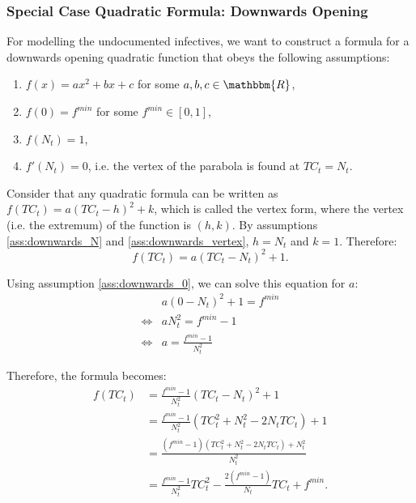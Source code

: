 \documentclass[12pt]{article}
\newcommand{\R}{\mathbbm{R}}
\begin{document}
\begin{appendices}
		\subsubsection{Special Case Quadratic Formula: Downwards Opening} \label{ssapp:downwards_derivation_vertex}
		For modelling the undocumented infectives, we want to construct a formula for a downwards opening quadratic function that obeys the following assumptions:
		\begin{enumerate}[label=(\Roman*)]
		    \item\label{ass:downwards_formula} $f(x) = ax^2 + bx + c$  for some $a, b, c \in \R$,
		    \item\label{ass:downwards_0} $f(0) = f^{min}$ for some $f^{min} \in [0,1]$,
		    \item\label{ass:downwards_N} $f(N_t) = 1$,
		    \item\label{ass:downwards_vertex} $f'(N_t) = 0$, i.e. the vertex of the parabola is found at $TC_t = N_t$.
		\end{enumerate}
		
		Consider that any quadratic formula can be written as $f(TC_t) = a(TC_t - h)^2 + k$, which is called the vertex form, where the vertex (i.e. the extremum) of the function is $(h, k)$. By assumptions \ref{ass:downwards_N} and \ref{ass:downwards_vertex}, $h=N_t$ and $k=1$. Therefore:
		    \[f(TC_t) = a(TC_t - N_t)^2 + 1.\]
		    
		\noindent Using assumption \ref{ass:downwards_0}, we can solve this equation for $a$:
		    \begin{align*}
		        & a(0 - N_t)^2 + 1 = f^{min}\\
		        \iff & aN_t^2 = f^{min} - 1\\
		        \iff & a = \frac{f^{min} - 1}{N_t^2}
		    \end{align*}
		    
		\noindent Therefore, the formula becomes:
		    \begin{align*}
		        f(TC_t) &= \frac{f^{min} - 1}{N_t^2}(TC_t - N_t)^2 + 1 \\
		        &= \frac{f^{min} - 1}{N_t^2}(TC_t^2 + N_t^2 -2N_tTC_t) + 1 \\
		        &= \frac{(f^{min} - 1)(TC_t^2 + N_t^2 -2N_tTC_t) + N_t^2}{N_t^2}\\
                &= \frac{f^{min} - 1}{N_t^2}TC_t^2 - \frac{2(f^{min} - 1)}{N_t}TC_t + f^{min}.
		    \end{align*}
		

\end{appendices}
\end{document}
